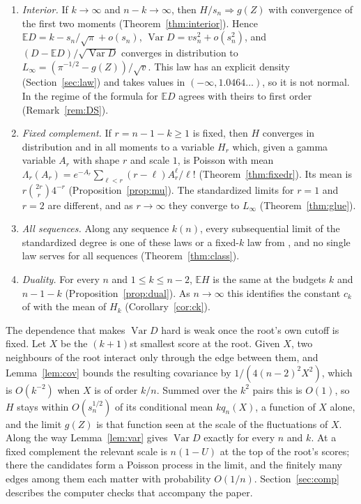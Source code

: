 \documentclass[11pt]{amsart}
\theoremstyle{remark}
\numberwithin{equation}{section}
\newcommand{\E}{\mathbb E}
\newcommand{\1}{\mathbf 1}
\newcommand{\Var}{\operatorname{Var}}
\begin{document}
\begin{enumerate}[label=(\arabic*),leftmargin=*]
\item \emph{Interior.} If $k\to\infty$ and $n-k\to\infty$, then $H/s_n\Rightarrow g(Z)$ with convergence of the first two moments (Theorem~\ref{thm:interior}). Hence $\E D=k-s_n/\sqrt\pi+o(s_n)$, $\Var D=vs_n^2+o(s_n^2)$, and $(D-\E D)/\sqrt{\Var D}$ converges in distribution to $L_\infty=(\pi^{-1/2}-g(Z))/\sqrt v$. This law has an explicit density (Section~\ref{sec:law}) and takes values in $(-\infty,1.0464\ldots)$, so it is not normal. In the regime of \cite[Theorem~8]{DS} the formula for $\E D$ agrees with theirs to first order (Remark~\ref{rem:DS}).
\item \emph{Fixed complement.} If $r=n-1-k\ge1$ is fixed, then $H$ converges in distribution and in all moments to a variable $H_r$ which, given a gamma variable $A_r$ with shape $r$ and scale $1$, is Poisson with mean $\Lambda_r(A_r)=e^{-A_r}\sum_{\ell<r}(r-\ell)A_r^\ell/\ell!$ (Theorem~\ref{thm:fixedr}). Its mean is $r\binom{2r}{r}4^{-r}$ (Proposition~\ref{prop:mu}). The standardized limits for $r=1$ and $r=2$ are different, and as $r\to\infty$ they converge to $L_\infty$ (Theorem~\ref{thm:glue}).
\item \emph{All sequences.} Along any sequence $k(n)$, every subsequential limit of the standardized degree is one of these laws or a fixed-$k$ law from \cite{EWT}, and no single law serves for all sequences (Theorem~\ref{thm:class}).
\item \emph{Duality.} For every $n$ and $1\le k\le n-2$, $\E H$ is the same at the budgets $k$ and $n-1-k$ (Proposition~\ref{prop:dual}). As $n\to\infty$ this identifies the constant $c_k$ of \cite[Theorem~7]{DS} with the mean of $H_k$ (Corollary~\ref{cor:ck}).
\end{enumerate}

The dependence that makes $\Var D$ hard is weak once the root's own cutoff is fixed. Let $X$ be the $(k+1)$st smallest score at the root. Given $X$, two neighbours of the root interact only through the edge between them, and Lemma~\ref{lem:cov} bounds the resulting covariance by $1/(4(n-2)^2X^2)$, which is $O(k^{-2})$ when $X$ is of order $k/n$. Summed over the $k^2$ pairs this is $O(1)$, so $H$ stays within $O(s_n^{1/2})$ of its conditional mean $kq_n(X)$, a function of $X$ alone, and the limit $g(Z)$ is that function seen at the scale of the fluctuations of $X$. Along the way Lemma~\ref{lem:var} gives $\Var D$ exactly for every $n$ and $k$. At a fixed complement the relevant scale is $n(1-U)$ at the top of the root's scores; there the candidates form a Poisson process in the limit, and the finitely many edges among them each matter with probability $O(1/n)$. Section~\ref{sec:comp} describes the computer checks that accompany the paper.
\end{document}
